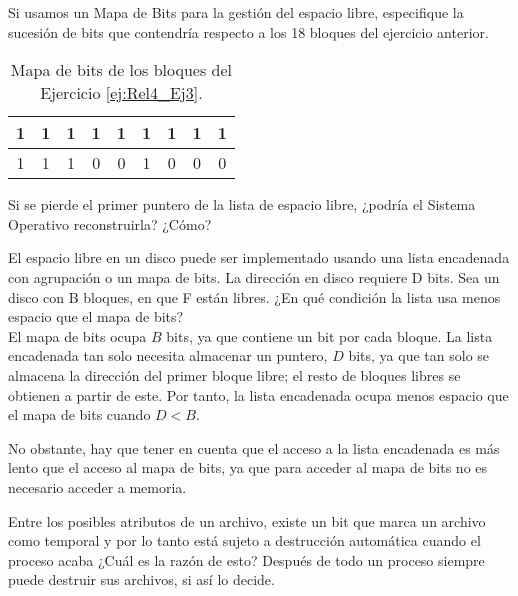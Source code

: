 \begin{ejercicio}
Si usamos un Mapa de Bits para la gestión del espacio libre, especifique la sucesión de bits que contendría
respecto a los 18 bloques del ejercicio anterior.

\begin{table}[H]
    \centering
    \begin{tabular}{ccccccccc}
        1 & 1 & 1 & 1 & 1 & 1 & 1 & 1 & 1 \\ \hline
        1 & 1 & 1 & 0 & 0 & 1 & 0 & 0 & 0
    \end{tabular}
    \caption{Mapa de bits de los bloques del Ejercicio \ref{ej:Rel4_Ej3}.}
\end{table}
\end{ejercicio}

\begin{ejercicio}
Si se pierde el primer puntero de la lista de espacio libre, ¿podría el Sistema Operativo reconstruirla? ¿Cómo?
\end{ejercicio}

\begin{ejercicio}
El espacio libre en un disco puede ser implementado usando una lista encadenada con agrupación o un mapa de bits.
La dirección en disco requiere D bits. Sea un disco con B bloques, en que F están libres.
¿En qué condición la lista usa menos espacio que el mapa de bits?\\

El mapa de bits ocupa $B$ bits, ya que contiene un bit por cada bloque.
La lista encadenada tan solo necesita almacenar un puntero, $D$ bits, ya que tan solo
se almacena la dirección del primer bloque libre; el resto de bloques libres se obtienen
a partir de este. Por tanto, la lista encadenada ocupa menos espacio que el mapa de bits
cuando $D < B$.

No obstante, hay que tener en cuenta que el acceso a la lista encadenada es más lento que
el acceso al mapa de bits, ya que para acceder al mapa de bits no es necesario
acceder a memoria.
\end{ejercicio}

\begin{ejercicio}
Entre los posibles atributos de un archivo, existe un bit que marca un archivo como temporal y por lo tanto está sujeto a destrucción automática cuando el proceso acaba ¿Cuál es la razón de esto? Después de todo un proceso siempre puede destruir sus archivos, si así lo decide.
\end{ejercicio}

